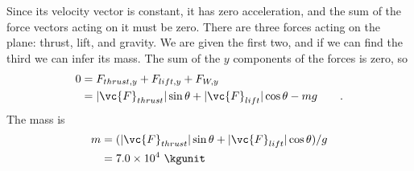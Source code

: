 Since its velocity vector is constant, it has zero
acceleration, and the sum of the force vectors acting on it
must be zero. There are three forces acting on the plane:
thrust, lift, and gravity. We are given the first two, and
if we can find the third we can infer its mass. The sum of
the $y$ components of the forces is zero, so
\begin{align*}
        0     &=  F_{thrust,y} +F_{lift,y} +F_{W,y}   \\
             &=  |\vc{F}_{thrust}| \sin  \theta 
               + |\vc{F}_{lift}| \cos  \theta - mg    \qquad   .
\end{align*}
The mass is
\begin{align*}
        m     &=  (|\vc{F}_{thrust}| \sin  \theta
                 + |\vc{F}_{lift}| \cos  \theta ) / g  \\
             &=  7.0\times10^4\ \kgunit
\end{align*}
